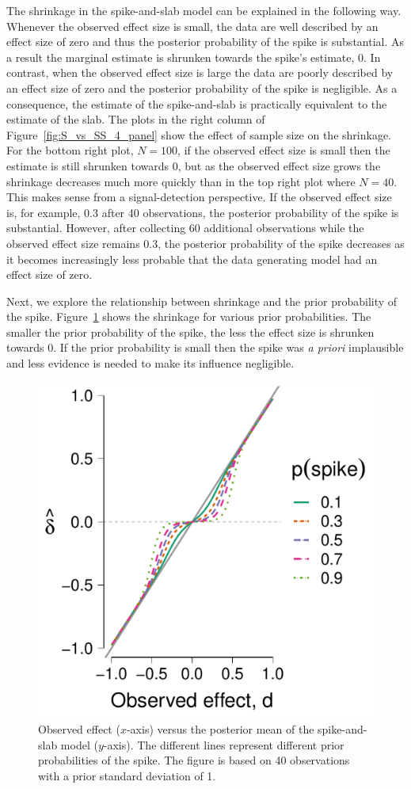 \documentclass[a4paper]{article}
\newenvironment{revision}{\color{black}}{\color{black}}
\begin{document}
\begin{revision}
The shrinkage in the spike-and-slab model can be explained in the following way.
Whenever the observed effect size is small, the data are well described by an effect size of zero and thus the posterior probability of the spike is substantial.
As a result the marginal estimate is shrunken towards the spike's estimate, 0.
In contrast, when the observed effect size is large the data are poorly described by an effect size of zero and the posterior probability of the spike is negligible.
As a consequence, the estimate of the spike-and-slab is practically equivalent to the estimate of the slab.
The plots in the right column of Figure~\ref{fig:S_vs_SS_4_panel} show the effect of sample size on the shrinkage.
For the bottom right plot, $N = 100$, if the observed effect size is small then the estimate is still shrunken towards 0, but as the observed effect size grows the shrinkage decreases much more quickly than in the top right plot where $N = 40$.
This makes sense from a signal-detection perspective. 
If the observed effect size is, for example, 0.3 after 40 observations, the posterior probability of the spike is substantial.
However, after collecting 60 additional observations while the observed effect size remains 0.3, the posterior probability of the spike decreases as it becomes increasingly less probable that the data generating model had an effect size of zero.

Next, we explore the relationship between shrinkage and the prior probability of the spike.
Figure~\ref{fig:S_vs_SS_PH0_40} shows the shrinkage for various prior probabilities.
The smaller the prior probability of the spike, the less the effect size is shrunken towards 0.
If the prior probability is small then the spike was \emph{a priori} implausible and less evidence is needed to make its influence negligible.
\begin{figure}[!ht]
	\centering
	\includegraphics[width=.5\textwidth]{posteriorMeanVsSampleDelta_ph0_n_40_big_font.pdf}
	\caption{%
		Observed effect ($x$-axis) versus the posterior mean of the spike-and-slab model ($y$-axis). The different lines represent different prior probabilities of the spike. The figure is based on 40 observations with a prior standard deviation of 1.
	}
	\label{fig:S_vs_SS_PH0_40}
\end{figure}


\end{revision}
\end{document}
